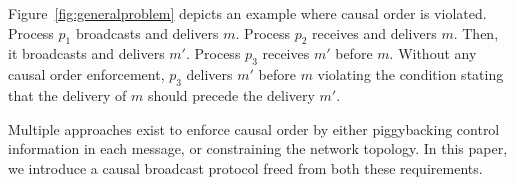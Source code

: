 Figure~\ref{fig:generalproblem} depicts an example where causal order is
violated. Process $p_1$ broadcasts and delivers $m$. Process $p_2$ receives and
delivers $m$. Then, it broadcasts and delivers $m'$. Process $p_3$ receives $m'$
before $m$. Without any causal order enforcement, $p_3$ delivers $m'$ before $m$
violating the condition stating that the delivery of $m$ should precede the
delivery $m'$.

Multiple approaches exist to enforce causal order by either piggybacking control
information in each message, or constraining the network topology. In this
paper, we introduce a causal broadcast protocol freed from both these
requirements.



